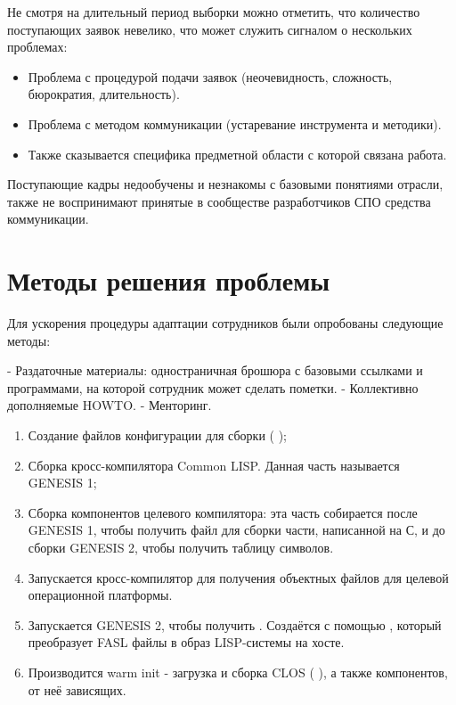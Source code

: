 Не смотря на длительный период выборки можно отметить, что количество
поступающих заявок невелико, что может служить сигналом о нескольких
проблемах:

\begin{itemize}
\item Проблема с процедурой подачи заявок (неочевидность, сложность,
бюрократия, длительность).
\item Проблема с методом коммуникации (устаревание инструмента и
методики).
\item Также сказывается специфика предметной области с которой связана
работа.
\end{itemize}

Поступающие кадры недообучены и незнакомы с базовыми понятиями отрасли,
также не воспринимают принятые в сообществе разработчиков СПО средства
коммуникации.


\section{Методы решения проблемы}

Для ускорения процедуры адаптации сотрудников были опробованы следующие
методы:

- Раздаточные материалы: одностраничная брошюра с базовыми ссылками и
  программами, на которой сотрудник может сделать пометки.
- Коллективно дополняемые HOWTO.
- Менторинг.


\begin{enumerate}
\item Создание файлов конфигурации для сборки (  );
\item Сборка кросс-компилятора Common LISP. Данная часть называется
GENESIS 1;
\item Сборка компонентов целевого компилятора: эта часть собирается после
GENESIS 1, чтобы получить файл  для сборки части, написанной на
С, и до сборки GENESIS 2, чтобы получить таблицу символов.
\item Запускается кросс-компилятор для получения объектных файлов для
целевой операционной платформы.
\item Запускается GENESIS 2, чтобы получить .
Создаётся с помощью , который
преобразует FASL файлы в образ LISP-системы на хосте.
\item Производится warm init - загрузка и сборка CLOS
(  ), а также компонентов, от неё зависящих.
\end{enumerate}

